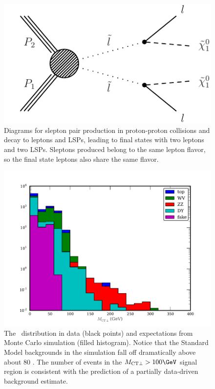 \begin{figure}
    \begin{center}
        \includegraphics[]{TSlepSlepDiagram}
        \caption{Diagrams for slepton pair production in proton-proton collisions and decay to leptons and LSPs, leading to final states with two leptons and two LSPs. Sleptons produced belong to the same lepton flavor, so the final state leptons also share the same flavor.}
        \label{fig:TSlepSlepDiagram}
    \end{center}
\end{figure}

\begin{figure}
    \begin{center}
        \includegraphics[]{OSDil_MCTDistribution}
        \caption{The \mctp\ distribution in data (black points) and expectations from Monte Carlo simulation (filled histogram). Notice that the Standard Model backgrounds in the simulation fall off dramatically above about 80 \GeV. The number of events in the $\mctp > 100\GeV$ signal region is consistent with the prediction of a partially data-driven background estimate.}
        \label{fig:OSDil_MCTDistribution}
    \end{center}
\end{figure}


